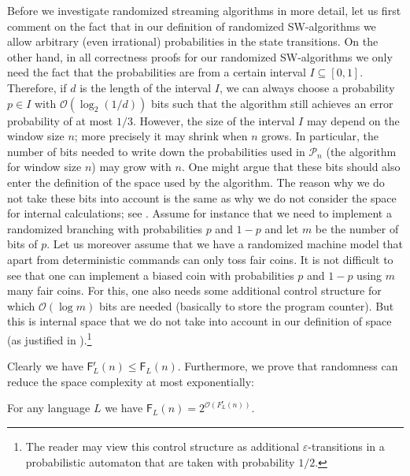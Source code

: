 \documentclass{theoretics}
\renewcommand{\O}{\mathcal{O}}
\renewcommand{\P}{\mathcal{P}}
\newcommand{\F}{\mathsf{F}}
\renewcommand{\r}{\mathsf{r}}
\renewcommand{\leq}{\leqslant}
\renewcommand{\le}{\leq}
\begin{document}
Before we investigate randomized streaming algorithms in more detail, let us first comment on the fact that in our 
definition of randomized SW-algorithms we allow arbitrary (even irrational) probabilities in the state transitions.
On the other hand, in all correctness proofs for our randomized SW-algorithms we only need the fact that
the probabilities are from a certain  interval $I \subseteq [0,1]$. Therefore, if $d$ is the length of the interval $I$, we can always choose a probability $p \in I$ with $\O(\log_2(1/d))$ bits such that the algorithm still achieves an error probability of at most $1/3$.
However, the size of the interval $I$ may depend on the window size $n$; more precisely it may shrink when $n$ grows.
In particular, the number of bits needed to write down the probabilities used in $\P_n$ (the algorithm for window size $n$)
may grow with $n$. One might argue that these bits should also enter the definition of the space used by the algorithm.
The reason why we do not take these bits into account is the same as why we do not consider the space  
 for internal calculations; see .
 Assume for instance that we need to implement a randomized branching with probabilities $p$ and $1-p$ and 
 let $m$ be the number of bits of $p$. Let us moreover assume that we have a randomized machine model that
 apart from deterministic commands can only toss fair coins.
  It is not difficult to see that one can implement a biased coin with probabilities $p$ and $1-p$ using 
  $m$ many fair coins. For this, one also needs some additional
 control structure for which $\O(\log m)$ bits are needed (basically to store the program counter). But this is internal space that we do not take into account in our definition of space (as justified in ).\footnote{The reader may
 view this control structure as additional $\varepsilon$-transitions in a probabilistic automaton that are taken with probability
 $1/2$.}


Clearly we have $\F^\r_L(n) \le \F_L(n)$.
Furthermore, we prove that randomness can reduce
the space complexity at most exponentially:

\begin{lemma}
\label{lem:rabin}
For any language $L$ we have $\F_L(n) = 2^{\O(F^\r_L(n))}$.
\end{lemma}
\end{document}

